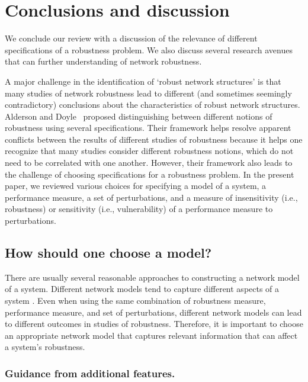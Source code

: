 \documentclass{comnet-mod}
\begin{document}
\section{Conclusions and discussion}
\label{sec:review:conclusion}

We conclude our review with a discussion of the relevance of different specifications of a robustness problem. We also discuss several research avenues that can further understanding of network robustness.

A major challenge in the identification of `robust network structures' is that many studies of network robustness lead to different (and sometimes seemingly contradictory) conclusions about the characteristics of robust network structures. Alderson and Doyle~\cite{Alderson2010} proposed distinguishing between different notions of robustness using several specifications. Their framework helps resolve apparent conflicts between the results of different studies of robustness because it helps one recognize that many studies consider different robustness notions, which do not need to be correlated with one another. However, their framework also leads to the challenge of choosing specifications for a robustness problem. In the present paper, we reviewed various choices for specifying a model of a system, a performance measure, a set of perturbations, and a measure of insensitivity (i.e., robustness) or sensitivity (i.e., vulnerability) of a performance measure to perturbations.


\subsection{How should one choose a model?}\label{sec:choose_model}

There are usually several reasonable approaches to constructing a network model of a system.
Different network models tend to capture different aspects of a system \cite{Winterbach2011}. 
Even when using the same combination of robustness measure, performance measure, and set of perturbations, different network models can lead to different outcomes in studies of robustness. Therefore, it is important to choose an appropriate network model that captures relevant information that can affect a system's robustness.


\subsubsection{Guidance from additional features.}\label{sec:choose_model_from_features}
\end{document}
